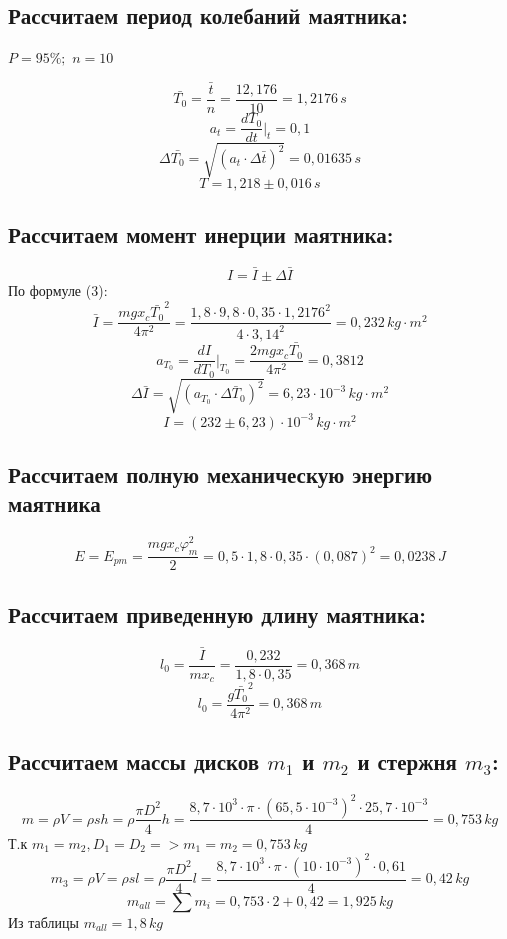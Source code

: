 \documentclass[a4paper,12pt]{report}
\begin{document}
\subsection*{Рассчитаем период колебаний маятника: }
$P = 95\%;$
$n = 10$    

\[\bar{T_0} = \frac{\bar{t}}{n} = \frac{12,176}{10} = 1,2176 \, s \]
\[ a_t = \frac{dT_0}{dt}\bigg\vert_t = 0,1 \]
\[ \Delta\bar{T_0} = \sqrt{(a_t \cdot \Delta \bar{t})^2} = 0,01635 \, s \]
\[ T = 1,218 \pm 0,016 \, s\]

\subsection*{Рассчитаем момент инерции маятника:}

\[I = \bar{I} \pm \Delta \bar{I} \]
По формуле (3):
\[\bar{I} = \frac{mgx_{c}\bar{T_0}^2}{4\pi^2} = \frac{1,8 \cdot 9,8 \cdot 0,35 \cdot 1,2176^2}{4 \cdot 3,14^2} = 0,232 \, kg \cdot m^2\]
\[ a_{T_0} = \frac{dI}{dT_0}\bigg \vert_{T_0} =\frac{2mgx_{c}\bar{T_0}}{4\pi^2} = 0,3812\]
\[ \Delta \bar{I} = \sqrt{(a_{T_0} \cdot \Delta\bar T_0)^2} =  6,23\cdot 10^{-3} \, kg\cdot m^2\]
\[ I = (232 \pm 6,23)\cdot 10^{-3} \, kg\cdot m^2 \]

\subsection*{Рассчитаем полную механическую энергию маятника}

\[ E = E_{pm} = \frac{mgx_c\varphi_m^2}{2} = 0,5 \cdot 1,8 \cdot 0,35 \cdot (0,087)^2 = 0,0238 \, J\]

\subsection*{Рассчитаем приведенную длину маятника:}

\[ l_0 = \frac{\bar{I}}{mx_c} = \frac{0,232}{1,8 \cdot 0,35} = 0,368 \, m \]
\[ l_0 = \frac{g\bar{T_0}^2}{4\pi^2} = 0,368 \, m \]

\subsection*{Рассчитаем массы дисков $m_1$ и $m_2$ и стержня $m_3$:}

\[ m = \rho V = \rho s h = \rho \frac{\pi D^2}{4} h = \frac{8,7\cdot 10^{3}\cdot \pi \cdot (65,5\cdot 10^{-3})^2 \cdot 25,7\cdot 10^{-3} }{4} = 0,753 \, kg\]
Т.к $m_1 = m_2, D_1 = D_2 => m_1 = m_2 = 0,753 \, kg$
\[ m_3 = \rho V = \rho s l = \rho \frac{\pi D^2}{4} l = \frac{8,7\cdot 10^{3}\cdot \pi \cdot (10\cdot 10^{-3})^2 \cdot 0,61}{4} = 0,42 \, kg \]
\[m_{all} = \sum m_i = 0,753\cdot 2 + 0,42 = 1,925 \, kg\]
Из таблицы $m_{all} = 1,8 \, kg$
\end{document}
